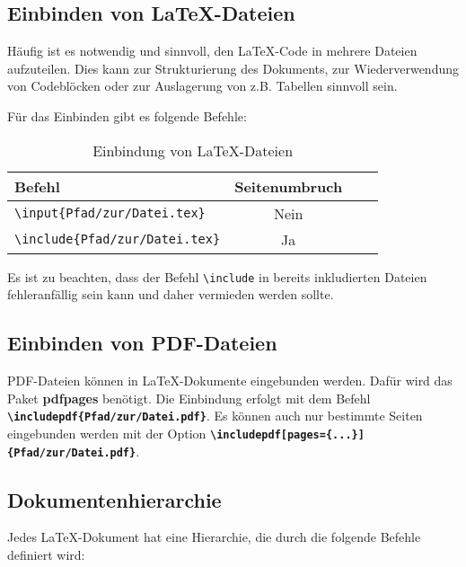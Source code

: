 \subsection{Einbinden von \LaTeX{}-Dateien}
\label{sec:einbinden_von_latex_dateien}
Häufig ist es notwendig und sinnvoll, den \LaTeX{}-Code in mehrere Dateien aufzuteilen. Dies kann zur Strukturierung des Dokuments, zur Wiederverwendung von Codeblöcken oder zur Auslagerung von z.B. Tabellen sinnvoll sein.

Für das Einbinden gibt es folgende Befehle:
\begin{table}[H]
    \centering
    \renewcommand{\arraystretch}{1.1}
    \begin{tabular}{lccc}
        \toprule
        \textbf{Befehl}                                       & \textbf{Seitenumbruch} \\
        \midrule
        \texttt{\textbackslash input\{Pfad/zur/Datei.tex\}}   & Nein                   \\
        \texttt{\textbackslash include\{Pfad/zur/Datei.tex\}} & Ja                     \\

        \bottomrule
    \end{tabular}
    \caption{Einbindung von \LaTeX{}-Dateien}
    \label{tab:latex_einbindung}
\end{table}

Es ist zu beachten, dass der Befehl \texttt{\textbackslash include} in bereits inkludierten Dateien fehleranfällig sein kann und daher vermieden werden sollte.

\subsection{Einbinden von PDF-Dateien}
\label{sec:einbinden_von_pdf_dateien}
PDF-Dateien können in \LaTeX{}-Dokumente eingebunden werden. Dafür wird das Paket \textbf{pdfpages} benötigt. Die Einbindung erfolgt mit dem Befehl \textbf{\texttt{\textbackslash includepdf\{Pfad/zur/Datei.pdf\}}}. Es können auch nur bestimmte Seiten eingebunden werden mit der Option \textbf{\texttt{\textbackslash includepdf[pages=\{...\}]\{Pfad/zur/Datei.pdf\}}}.

\newpage

\subsection{Dokumentenhierarchie}
Jedes \LaTeX{}-Dokument hat eine Hierarchie, die durch die folgende Befehle definiert wird:

